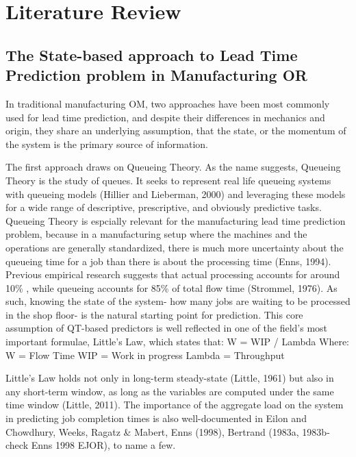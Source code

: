 \documentclass[
]{ceurart}
\begin{document}








\section{Literature Review}
\subsection{The State-based approach to Lead Time Prediction problem in Manufacturing OR}

In traditional manufacturing OM, two approaches have been most commonly used for lead time prediction, and despite their differences in mechanics and origin, they share an underlying assumption, that the state, or the momentum of
the system is the primary source of information.

The first approach draws on Queueing Theory. As the name suggests, Queueing Theory is the study of queues. It seeks to represent real life queueing systems with queueing models (Hillier and Lieberman, 2000) and leveraging these models for a wide range of descriptive, prescriptive, and obviously predictive tasks.
Queueing Theory is espcially relevant for the manufacturing lead time prediction problem, because in a manufacturing setup where the machines and the operations are generally standardized, there is much more uncertainty about the queueing time for a job than there is about the processing time (Enns, 1994). Previous empirical research suggests that actual processing
accounts for around 10\% , while queueing accounts for 85\% of total flow time (Strommel, 1976). As such, knowing the state of the system- how many jobs are waiting to be processed in the shop floor- is the natural starting point for
prediction. This core assumption of QT-based predictors is well reflected in one of the field's most important formulae, Little's Law, which states that:
 W = WIP / Lambda
 Where:
 W = Flow Time
 WIP = Work in progress
 Lambda = Throughput

 Little's Law holds not only in long-term steady-state (Little, 1961) but also in any short-term window, as long as the variables are computed under the same time window (Little, 2011). 
 The importance of the aggregate load on the system in predicting job completion times is also well-documented in Eilon and Chowdhury, Weeks, Ragatz & Mabert, Enns (1998), Bertrand (1983a, 1983b-check Enns 1998 EJOR), to name a few. 
\end{document}

